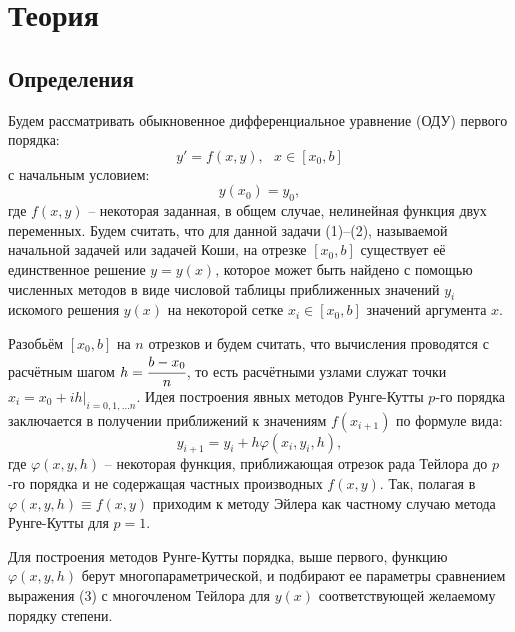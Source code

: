 \section{Теория}

\subsection{Определения}

Будем рассматривать обыкновенное дифференциальное уравнение (ОДУ) первого порядка:
\begin{equation}
    y'=f(x,y), ~~~ x \in [x_0, b]
\end{equation}
с начальным условием:
\begin{equation}
    y(x_0) = y_0,
\end{equation}
где $f(x,y)$ -- некоторая заданная, в общем случае, нелинейная функция двух переменных. Будем считать, что для данной задачи (1)--(2), называемой начальной задачей или задачей Коши, на отрезке $[x_0, b]$ существует её единственное решение $y = y(x)$, которое может быть найдено с помощью численных методов в виде числовой таблицы приближенных значений $y_i$ искомого решения $y(x)$ на некоторой сетке $x_i \in [x_0, b]$ значений аргумента $x$.

Разобьём $[x_0, b]$ на $n$ отрезков и будем считать, что вычисления проводятся с расчётным шагом $h=\cfrac{b-x_0}{n}$, то есть расчётными узлами служат точки $x_i=x_0 + ih|_{i=0,1,\ldots n}$. Идея построения явных методов Рунге-Кутты $p$-го порядка заключается в получении приближений к значениям $f(x_{i+1})$ по формуле вида:
\begin{equation}
    y_{i+1} = y_i + h\varphi(x_i, y_i, h),
\end{equation}
где $\varphi(x,y,h)$ -- некоторая функция, приближающая отрезок рада Тейлора до $p$-го порядка и не содержащая частных производных $f(x,y)$. Так, полагая в $\varphi(x,y,h) \equiv f(x,y)$ приходим к методу Эйлера как частному случаю метода Рунге-Кутты для $p=1$.

Для построения методов Рунге-Кутты порядка, выше первого, функцию $\varphi(x,y,h)$ берут многопараметрической, и подбирают ее параметры сравнением выражения (3) с многочленом Тейлора для $y(x)$ соответствующей желаемому порядку степени.

